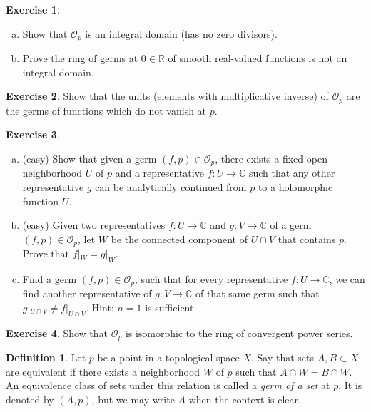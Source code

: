 \documentclass[12pt,openany]{book}
\newcommand{\C}{{\mathbb{C}}}
\newcommand{\R}{{\mathbb{R}}}
\newcommand{\sO}{{\mathscr{O}}}
\newcommand{\myindex}[1]{#1\index{#1}}
\theoremstyle{plain}
\theoremstyle{remark}
\theoremstyle{definition}
\newtheorem{defn}[thm]{Definition}
\newenvironment{exbox}{%
    \def\FrameCommand{\vrule width 1pt \relax\hspace{10pt}}%
    \MakeFramed{\advance\hsize-\width\FrameRestore}%
}{%
    \endMakeFramed
}
\newenvironment{exparts}{%
    \leavevmode\begin{enumerate}[a),noitemsep,topsep=0pt,parsep=0pt,partopsep=0pt]
}{%
    \end{enumerate}
}
\theoremstyle{exercise}
\newtheorem{exercise}{Exercise}[section]
\theoremstyle{example}
\begin{document}
\begin{exbox}
\begin{exercise}
\begin{exparts}
\item
Show that $\sO_p$ is an \myindex{integral domain} (has no zero divisors).
\item
Prove the ring of germs at $0 \in \R$ of smooth real-valued functions
is not an integral domain.
\end{exparts}
\end{exercise}

\begin{exercise}
Show that the units (elements with multiplicative inverse)
of $\sO_p$ are the germs of functions which do not vanish at
$p$.
\end{exercise}

\begin{exercise}
\begin{exparts}
\item (easy)
Show that given a germ $(f,p) \in \sO_p$,
there exists a fixed open neighborhood $U$
of $p$ and a representative $f \colon U \to \C$ such that any other
representative $g$ can be analytically continued from $p$ to a holomorphic
function $U$.
\item
(easy) Given two representatives $f \colon U \to \C$
and $g \colon V \to \C$ of a germ $(f,p) \in \sO_p$,
let $W$ be the connected component of $U \cap V$
that contains $p$.  Prove that $f|_W = g|_W$.
\item
Find a germ $(f,p) \in \sO_p$, such that for
every representative $f \colon U \to \C$, we can
find another representative of $g \colon V \to \C$
of that same germ such that $g|_{U \cap V} \not= f|_{U \cap V}$.
Hint: $n=1$ is sufficient.
\end{exparts}
\end{exercise}

\begin{exercise}
Show that $\sO_p$ is isomorphic to the ring of convergent power series.
\end{exercise}
\end{exbox}


\begin{defn}
Let $p$ be a point in a topological space $X$.
Say that sets $A, B \subset X$ are equivalent
if there exists a neighborhood $W$ of $p$
such that $A \cap W = B \cap W$.
An equivalence class of sets under this relation
is called a \emph{\myindex{germ of a set}} at $p$.
%
It is denoted by $(A,p)$, but we may write $A$ when
the context is clear.
\end{defn}
\end{document}
